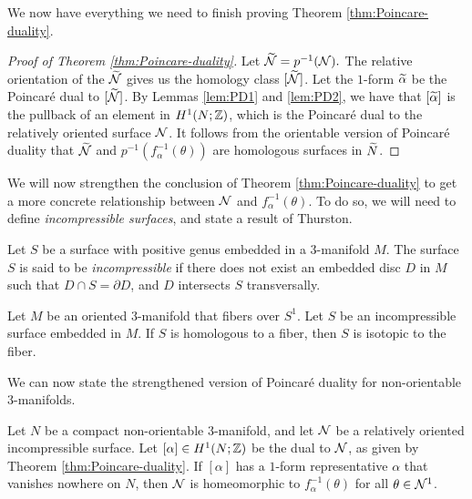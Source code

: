 We now have everything we need to finish proving Theorem \ref{thm:Poincare-duality}.
\begin{proof}[Proof of Theorem \ref{thm:Poincare-duality}]
  Let $\widetilde{\mathcal{N}}=p^{-1}(\mathcal{N}).$
  The relative orientation of the $\widetilde{\mathcal{N}}$ gives us the homology class $[\widetilde{\mathcal{N}}]$.  Let the $1$-form $\widetilde{\alpha}$ be the Poincar\'e dual to $[\widetilde{\mathcal{N}}]$.
  By Lemmas \ref{lem:PD1} and \ref{lem:PD2}, we have that $[\widetilde{\alpha}]$ is the pullback of an element in $H^1(N; \mathbb{Z})$, which is the Poincar\'e dual to the relatively oriented surface $\mathcal{N}$.
  It follows from the orientable version of Poincar\'e duality that $\widetilde{\mathcal{N}}$ and $p^{-1}(f_{\alpha}^{-1}(\theta))$ are homologous surfaces in $\widetilde{N}$.
\end{proof}

We will now strengthen the conclusion of Theorem \ref{thm:Poincare-duality} to get a more concrete relationship between $\mathcal{N}$ and $f_{\alpha}^{-1}(\theta)$.
To do so, we will need to define \emph{incompressible surfaces}, and state a result of Thurston.

  Let $S$ be a surface with positive genus embedded in a $3$-manifold $M$.
  The surface $S$ is said to be \emph{incompressible} if there does not exist an embedded disc $D$ in $M$ such that $D \cap S = \partial D$, and $D$ intersects $S$ transversally.

\begin{thm}
  \label{thm:Thur2}
Let $M$ be an oriented 3-manifold that fibers over $S^1$.  Let $S$ be an incompressible surface embedded in $M$.  If $S$ is homologous to a fiber, then $S$ is isotopic to the fiber.
\end{thm}

We can now state the strengthened version of Poincar\'e duality for non-orientable $3$-manifolds.
\begin{thm}
  \label{thm:strong-duality}
  Let $N$ be a compact non-orientable $3$-manifold, and let $\mathcal{N}$ be a relatively oriented incompressible surface.
  Let $[\alpha] \in H^1(N; \mathbb{Z})$ be the dual to $\mathcal{N}$, as given by Theorem \ref{thm:Poincare-duality}.
  If $[\alpha]$ has a $1$-form representative $\alpha$ that vanishes nowhere on $N$, then $\mathcal{N}$ is homeomorphic to $f_{\alpha}^{-1}(\theta)$ for all $\theta \in \mathcal{N}^1$.
\end{thm}

